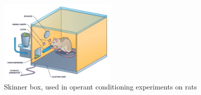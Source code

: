 \begin{figure}[H]
  \centering
  \includegraphics[width=0.5\textwidth]{figures/images/skinner_box.png}
  \caption[Skinner box]{Skinner box, used in operant conditioning experiments on rats \cite{mcleod2023b}}
  \label{fig:skinner_box}
\end{figure}
